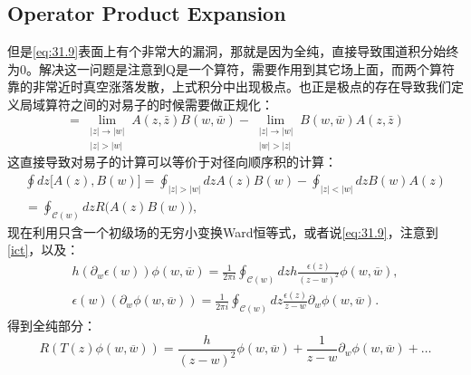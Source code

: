 \subsection{Operator Product Expansion}
但是\ref{eq:31.9}表面上有个非常大的漏洞，那就是因为全纯，直接导致围道积分始终为0。解决这一问题是注意到Q是一个算符，需要作用到其它场上面，而两个算符靠的非常近时真空涨落发散，上式积分中出现极点。也正是极点的存在导致我们定义局域算符之间的对易子的时候需要做正规化：
\begin{equation}
	[A(z,\bar{z}),B(w,\bar{w})]=\lim_{\begin{smallmatrix}|z|\rightarrow|w|\\|z|>|w|\end{smallmatrix}}A(z,\bar{z})B(w,\bar{w})-\lim_{\begin{smallmatrix}|z|\rightarrow|w|\\|w|>|z|\end{smallmatrix}}B(w,\bar{w})A(z,\bar{z})
\end{equation}
这直接导致对易子的计算可以等价于对径向顺序积的计算：
\begin{equation}
	\boxed{\begin{gathered}
			\oint dz\bigl[A(z),B(w)\bigr] =\oint_{|z|>|w|}dzA(z)B(w)-\oint_{|z|<|w|}dzB(w)A(z) \\
			=\oint_{\mathcal{C}(w)}dzR\Big(A(z)B(w)\Big), 
	\end{gathered}}
\end{equation}
现在利用只含一个初级场的无穷小变换Ward恒等式，或者说\ref{eq:31.9}，注意到\ref{ict}，以及：
\begin{equation}\label{eq:31.12}
	\begin{gathered}
		h\left(\partial_{w}\epsilon(w)\right)\phi(w,\overline{w}) =\frac{1}{2\pi i}\oint_{\mathcal{C}(w)}dzh\frac{\epsilon(z)}{(z-w)^{2}}\phi(w,\overline{w}), \\
		\epsilon(w)\left(\partial_{w}\phi(w,\overline{w})\right) =\frac1{2\pi i}\oint_{\mathcal{C}(w)}dz\frac{\epsilon(z)}{z-w}\partial_{w}\phi(w,\overline{w}).
	\end{gathered}
\end{equation}
得到全纯部分：
\begin{equation}
	R\left(T(z)\phi(w,\overline{w})\right)=\frac{h}{(z-w)^2}\phi(w,\overline{w})+\frac{1}{z-w}\partial_w\phi(w,\overline{w})+\ldots 
\end{equation}

